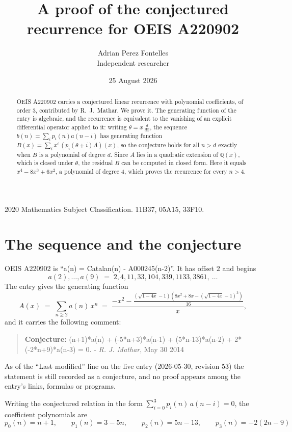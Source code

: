 \documentclass[11pt,a4paper]{article}
\title{A proof of the conjectured recurrence for OEIS A220902}
\author{Adrian Perez Fontelles\\ \small Independent researcher}
\date{25 August 2026}
\theoremstyle{plain}
\theoremstyle{definition}
\begin{document}
\maketitle

\begin{abstract}
OEIS A220902 carries a conjectured linear recurrence with polynomial coefficients, of
order 3, contributed by R.~J.~Mathar. We prove it. The generating function of the
entry is algebraic, and the recurrence is equivalent to the vanishing of an explicit
differential operator applied to it: writing $\theta=x\,\frac{d}{dx}$, the sequence
$b(n)=\sum_{i}p_{i}(n)a(n-i)$ has generating function
$B(x)=\sum_{i}x^{i}\,(p_{i}(\theta+i)A)(x)$, so the conjecture holds for all $n>d$ exactly
when $B$ is a polynomial of degree $d$. Since $A$ lies in a quadratic extension of
$\mathbb{Q}(x)$, which is closed under $\theta$, the residual $B$ can be computed in
closed form. Here it equals $x^{4} - 8 x^{3} + 6 x^{2}$, a polynomial of degree $4$, which proves
the recurrence for every $n>4$.
\end{abstract}

\noindent\small 2020 Mathematics Subject Classification. 11B37, 05A15, 33F10.\normalsize

\section{The sequence and the conjecture}

OEIS A220902 is ``a(n) = Catalan(n) - A000245(n-2)''. It has offset $2$ and begins
\[
a(2),\dots,a(9)\;=\;2, 4, 11, 33, 104, 339, 1133, 3861,\ \dots
\]
The entry gives the generating function
\begin{equation}\label{eq:gf}
A(x)\;=\;\sum_{n\ge 2} a(n)\,x^{n}\;=\;\frac{- x^{2} - \frac{\left(\sqrt{1 - 4 x} - 1\right) \left(8 x^{2} + 8 x - \left(\sqrt{1 - 4 x} - 1\right)^{3}\right)}{16}}{x} ,
\end{equation}
and it carries the following comment:
\begin{quote}\small
\textbf{Conjecture:} (n+1)*a(n) + (-5*n+3)*a(n-1) + (5*n-13)*a(n-2) + 2*(-2*n+9)*a(n-3) = 0. - \emph{R. J. Mathar}, May 30 2014
\end{quote}
As of the ``Last modified'' line on the live entry (2026-05-30, revision 53) the
statement is still recorded as a conjecture, and no proof appears among the entry's links,
formulas or programs.

Writing the conjectured relation in the form $\sum_{i=0}^{3}p_{i}(n)\,a(n-i)=0$,
the coefficient polynomials are
\[
p_{0}(n)=n + 1,\qquad p_{1}(n)=3 - 5 n,\qquad p_{2}(n)=5 n - 13,\qquad p_{3}(n)=- 2 \left(2 n - 9\right)
\]
\end{document}

